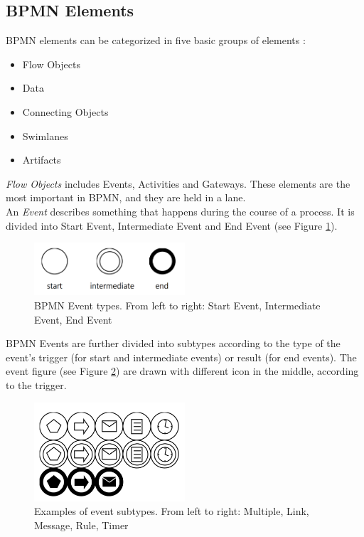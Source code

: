 \subsection{BPMN Elements}
BPMN elements can be categorized in five basic groups of elements\cite{BPMN2} :
\begin{itemize}
	\item Flow Objects
	\item Data
	\item Connecting Objects
	\item Swimlanes
	\item Artifacts
\end{itemize}
\textit{Flow Objects} includes Events, Activities and Gateways. These elements are the most important in BPMN, and they are held in a lane.\\

An \textit{Event} describes something that happens during the course of a process. It is divided into Start Event, Intermediate Event and End Event (see Figure \ref{fig:events}).\\
\begin{figure}[h]
	\centering
	\includegraphics[width=0.5\textwidth]{images/events.png}
	\caption{BPMN Event types. From left to right: Start Event, Intermediate Event, End Event}
	\label{fig:events}
\end{figure}

BPMN Events are further divided into subtypes according to the type of the event's trigger (for start and intermediate events) or result (for end events). The event figure (see Figure \ref{fig:event_subtypes}) are drawn with different icon in the middle, according to the trigger.
\begin{figure}[htbp]
	\centering
	\includegraphics[width=0.5\textwidth]{images/event_types.png}
	\caption{Examples of event subtypes. From left to right: Multiple, Link, Message, Rule, Timer}
	\label{fig:event_subtypes}
\end{figure}


